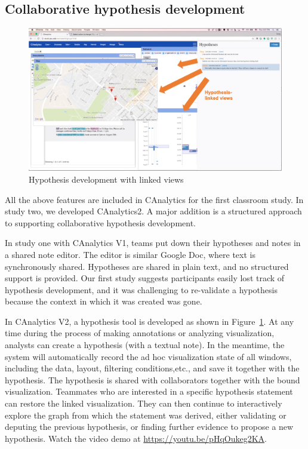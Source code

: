 \subsection{Collaborative hypothesis development}\label{feature-hypothesis}

\begin{figure}
	\centering
	\includegraphics[width=\columnwidth]{03-System/img/hypothesis.jpg}
	\caption{Hypothesis development with linked views \label{fig:hypothesis}}
\end{figure}

All the above features are included in CAnalytics for the first classroom study. In study two, we developed CAnalytics2. A major addition is a structured approach to supporting collaborative hypothesis development. 

In study one with CAnalytics V1, teams put down their hypotheses and notes in a shared note editor. The editor is similar Google Doc, where text is synchronously shared. Hypotheses are shared in plain text, and no structured support is provided. Our first study suggests participants easily lost track of hypothesis development, and it was challenging to re-validate a hypothesis because the context in which it was created was gone. 

In CAnalytics V2, a hypothesis tool is developed as shown in Figure~\ref{fig:hypothesis}. At any time during the process of making annotations or analyzing visualization, analysts can create a hypothesis (with a textual note). In the meantime, the system will automatically record the ad hoc visualization state of all windows, including the data, layout, filtering conditions,etc., and save it together with the hypothesis. The hypothesis is shared with collaborators together with the bound visualization. Teammates who are interested in a specific hypothesis statement can restore the linked visualization. They can then continue to interactively explore the graph from which the statement was derived, either validating or deputing the previous hypothesis, or finding further evidence to propose a new hypothesis. Watch the video demo at  \url{https://youtu.be/pHqOukeg2KA}.
